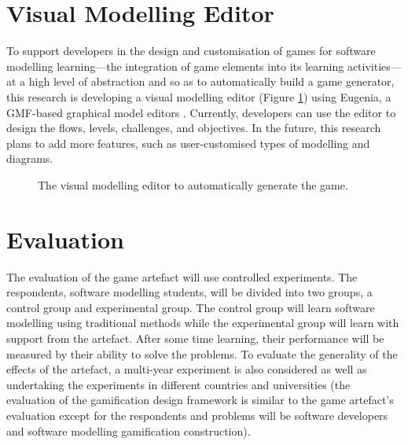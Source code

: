 \documentclass[runningheads,a4paper]{llncs}
\begin{document}
\section{Visual Modelling Editor}
To support developers in the design and customisation of games for software modelling learning---the integration of game elements into its learning activities---at a high level of abstraction and so as to automatically build a game generator, this research is developing a visual modelling editor (Figure \ref{fig:002}) using Eugenia, a GMF-based graphical model editors \cite{kolovos2015eugenia}. Currently, developers can use the editor to design the flows, levels, challenges, and objectives. In the future, this research plans to add more features, such as user-customised types of modelling and diagrams. 

\begin{figure}[t]
\centering
{}
\caption{The visual modelling editor to automatically generate the game.}
\label{fig:002}
\end{figure}

\section{Evaluation}
The evaluation of the game artefact will use controlled experiments. The respondents, software modelling students, will be divided into two groups, a control group and experimental group. The control group will learn software modelling using traditional methods while the experimental group will learn with support from the artefact. After some time learning, their performance will be measured by their ability to solve the problems. To evaluate the generality of the effects of the artefact, a multi-year experiment is also considered as well as undertaking the experiments in different countries and universities (the evaluation of the gamification design framework is similar to the game artefact's evaluation except for the respondents and problems will be software developers and software modelling gamification construction).
\end{document}
